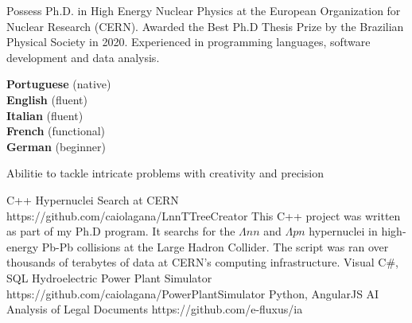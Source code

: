 \documentclass[9pt]{developercv} %
\begin{document}
\begin{minipage}[t]{0.46\textwidth}
	\vspace{-6pt}
 
  Possess Ph.D. in High Energy Nuclear Physics at the European Organization for Nuclear Research (CERN). Awarded the Best Ph.D Thesis Prize by the Brazilian Physical Society in 2020. Experienced in programming languages, software development and data analysis. \\
\end{minipage}
\hfill %
\begin{minipage}[t]{0.465\textwidth}
    \vspace{-6pt}

	\begin{minipage}[t]{0.35\textwidth}
		\textbf{Portuguese} (native)\vspace{0.5mm}\\
		\textbf{English} (fluent)\vspace{0.5mm}\\
		\textbf{Italian} (fluent)\vspace{0.5mm}\\
		\textbf{French} (functional)\vspace{0.5mm}\\
		\textbf{German} (beginner)
    \end{minipage}
    \hfill
    \begin{minipage}[t]{0.55\textwidth}
	Abilitie to tackle intricate problems with creativity and precision
    \end{minipage}
    
\end{minipage}


\vspace{10 pt}
\begin{entrylist}
	\entry
		{C++}
		{Hypernuclei Search at CERN}
		{https://github.com/caiolagana/LnnTTreeCreator}
		{This C++ project was written as part of my Ph.D program. It searchs for the $\Lambda nn$ and $\Lambda pn$ hypernuclei in high-energy Pb-Pb collisions at the Large Hadron Collider. The script was ran over thousands of terabytes of data at CERN's computing infrastructure.}
    \entry
		{Visual C\#, SQL}
		{Hydroelectric Power Plant Simulator}
		{https://github.com/caiolagana/PowerPlantSimulator}
		{%
        \lipsum[1][1-3]}
    \entry
		{Python, AngularJS}
		{AI Analysis of Legal Documents}
		{https://github.com/e-fluxus/ia}
		{%
        \lipsum[1][1-3]}
\end{entrylist}
\end{document}
